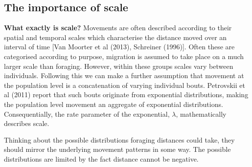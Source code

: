 \documentclass[11pt,usenames,dvipsnames]{article}
\begin{document}
\subsection{The importance of scale}

\textbf{What exactly is scale?} Movements are often described according to their spatial and temporal scales which characterise the distance moved over an interval of time [Van Moorter et al (2013), Schreiner (1996)]. Often these are categorised according to purpose, migration is assumed to take place on a much larger scale than foraging. However, within these groups scales vary between individuals. Following this we can make a further assumption that movement at the population level is a concatenation of varying individual bouts. Petrovskii et al (2011) report that such bouts originate from exponential distributions, making the population level movement an aggregate of exponential distributions. Consequentially, the rate parameter of the exponential, $\lambda$, mathematically describes scale.  

Thinking about the possible distributions foraging distances could take, they should mirror the underlying movement patterns in some way. The possible distributions are limited by the fact distance cannot be negative.
\end{document}
